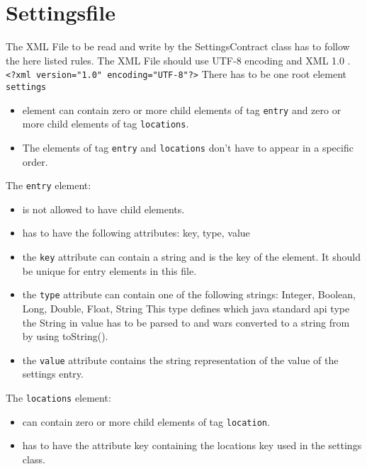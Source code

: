 \documentclass[10pt]{scrreprt}
\begin{document}
\section{Settingsfile}
The XML File to be read and write by the SettingsContract class has to follow the here listed rules.
The XML File should use UTF-8 encoding and XML 1.0 .
\texttt{<?xml version="1.0" encoding="UTF-8"?>}
There has to be one root element \texttt{settings}
\begin{itemize}
 \item element can contain zero or more child elements of tag \texttt{entry} and zero or more child elements of tag \texttt{locations}.
 \item The elements of tag \texttt{entry} and \texttt{locations} don't have to appear in a specific order.
\end{itemize}

The \texttt{entry} element:
\begin{itemize}
 \item is not allowed to have child elements.
 \item has to have the following attributes: key, type, value
 \item the \texttt{key} attribute can contain a string and is the key of the element. It should be unique for entry elements in this file.
 \item the \texttt{type} attribute can contain one of the following strings: Integer, Boolean, Long, Double, Float, String
  This type defines which java standard api type the String in value has to be parsed to and wars converted to a string from by using toString().
 \item the \texttt{value} attribute contains the string representation of the value of the settings entry.
\end{itemize}

 The \texttt{locations} element:
\begin{itemize}
 \item can contain zero or more child elements of tag \texttt{location}.
 \item has to have the attribute key containing the locations key used in the settings class.
\end{itemize}
\end{document}
